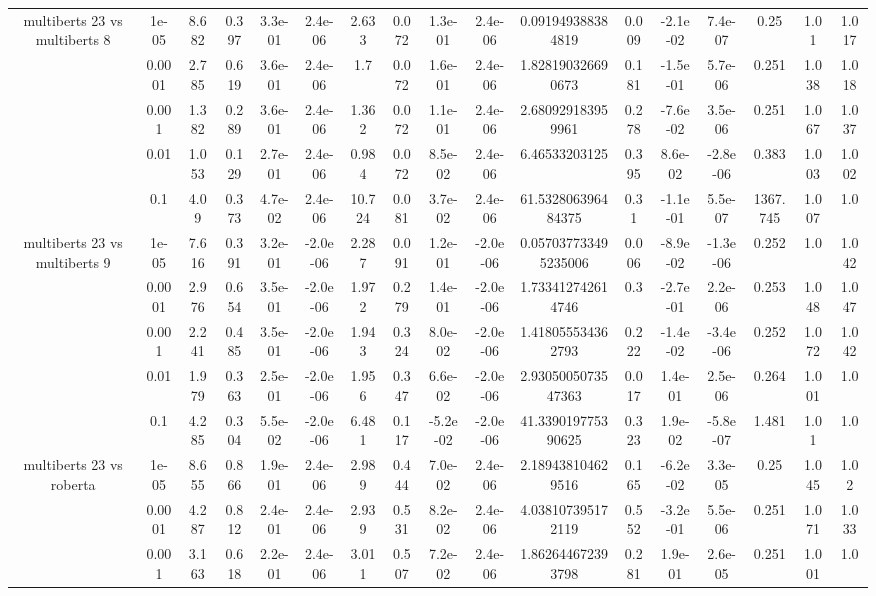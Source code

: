 \begin{tabular}{|c|c|c|c|c|c|c|c|c|c|c|c|c|c|c|c|c|}
\hline
\multirow{5}{*}{multiberts 23 vs multiberts 8} & 1e-05 & 8.682 & 0.397 & 3.3e-01 & 2.4e-06 & 2.633 & 0.072 & 1.3e-01 & 2.4e-06 & 0.091949388384819 & 0.009 & -2.1e-02 & 7.4e-07 & 0.25 & 1.01 & 1.017 \\
 & 0.0001 & 2.785 & 0.619 & 3.6e-01 & 2.4e-06 & 1.7 & 0.072 & 1.6e-01 & 2.4e-06 & 1.828190326690673 & 0.181 & -1.5e-01 & 5.7e-06 & 0.251 & 1.038 & 1.018 \\
 & 0.001 & 1.382 & 0.289 & 3.6e-01 & 2.4e-06 & 1.362 & 0.072 & 1.1e-01 & 2.4e-06 & 2.680929183959961 & 0.278 & -7.6e-02 & 3.5e-06 & 0.251 & 1.067 & 1.037 \\
 & 0.01 & 1.053 & 0.129 & 2.7e-01 & 2.4e-06 & 0.984 & 0.072 & 8.5e-02 & 2.4e-06 & 6.46533203125 & 0.395 & 8.6e-02 & -2.8e-06 & 0.383 & 1.003 & 1.002 \\
 & 0.1 & 4.09 & 0.373 & 4.7e-02 & 2.4e-06 & 10.724 & 0.081 & 3.7e-02 & 2.4e-06 & 61.532806396484375 & 0.31 & -1.1e-01 & 5.5e-07 & 1367.745 & 1.007 & 1.0 \\
\hline
\multirow{5}{*}{multiberts 23 vs multiberts 9} & 1e-05 & 7.616 & 0.391 & 3.2e-01 & -2.0e-06 & 2.287 & 0.091 & 1.2e-01 & -2.0e-06 & 0.057037733495235006 & 0.006 & -8.9e-02 & -1.3e-06 & 0.252 & 1.0 & 1.042 \\
 & 0.0001 & 2.976 & 0.654 & 3.5e-01 & -2.0e-06 & 1.972 & 0.279 & 1.4e-01 & -2.0e-06 & 1.733412742614746 & 0.3 & -2.7e-01 & 2.2e-06 & 0.253 & 1.048 & 1.047 \\
 & 0.001 & 2.241 & 0.485 & 3.5e-01 & -2.0e-06 & 1.943 & 0.324 & 8.0e-02 & -2.0e-06 & 1.418055534362793 & 0.222 & -1.4e-02 & -3.4e-06 & 0.252 & 1.072 & 1.042 \\
 & 0.01 & 1.979 & 0.363 & 2.5e-01 & -2.0e-06 & 1.956 & 0.347 & 6.6e-02 & -2.0e-06 & 2.9305005073547363 & 0.017 & 1.4e-01 & 2.5e-06 & 0.264 & 1.001 & 1.0 \\
 & 0.1 & 4.285 & 0.304 & 5.5e-02 & -2.0e-06 & 6.481 & 0.117 & -5.2e-02 & -2.0e-06 & 41.339019775390625 & 0.323 & 1.9e-02 & -5.8e-07 & 1.481 & 1.01 & 1.0 \\
\hline
\multirow{5}{*}{multiberts 23 vs roberta } & 1e-05 & 8.655 & 0.866 & 1.9e-01 & 2.4e-06 & 2.989 & 0.444 & 7.0e-02 & 2.4e-06 & 2.189438104629516 & 0.165 & -6.2e-02 & 3.3e-05 & 0.25 & 1.045 & 1.02 \\
 & 0.0001 & 4.287 & 0.812 & 2.4e-01 & 2.4e-06 & 2.939 & 0.531 & 8.2e-02 & 2.4e-06 & 4.038107395172119 & 0.552 & -3.2e-01 & 5.5e-06 & 0.251 & 1.071 & 1.033 \\
 & 0.001 & 3.163 & 0.618 & 2.2e-01 & 2.4e-06 & 3.011 & 0.507 & 7.2e-02 & 2.4e-06 & 1.862644672393798 & 0.281 & 1.9e-01 & 2.6e-05 & 0.251 & 1.001 & 1.0 \\

\end{tabular}
